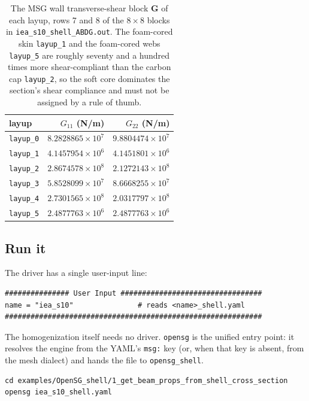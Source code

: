 \begin{table}[htbp]
\centering
\small
\begin{tabular}{lrr}
\toprule
layup & $G_{11}$ (N/m) & $G_{22}$ (N/m) \\
\midrule
\texttt{layup\_0} & $8.2828865\times10^{7}$ & $9.8804474\times10^{7}$ \\
\texttt{layup\_1} & $4.1457954\times10^{6}$ & $4.1451801\times10^{6}$ \\
\texttt{layup\_2} & $2.8674578\times10^{8}$ & $2.1272143\times10^{8}$ \\
\texttt{layup\_3} & $5.8528099\times10^{7}$ & $8.6668255\times10^{7}$ \\
\texttt{layup\_4} & $2.7301565\times10^{8}$ & $2.0317797\times10^{8}$ \\
\texttt{layup\_5} & $2.4877763\times10^{6}$ & $2.4877763\times10^{6}$ \\
\bottomrule
\end{tabular}
\caption{The MSG wall transverse-shear block $\mathbf{G}$ of each layup, rows 7
and 8 of the $8\times8$ blocks in \texttt{iea\_s10\_shell\_ABDG.out}. The
foam-cored skin \texttt{layup\_1} and the foam-cored webs \texttt{layup\_5} are
roughly seventy and a hundred times more shear-compliant than the carbon cap
\texttt{layup\_2}, so the soft core dominates the section's shear compliance and
must not be assigned by a rule of thumb.}
\label{tab:shell-gblocks}
\end{table}

\subsection{Run it}

The driver has a single user-input line:

\begin{lstlisting}[style=opensg,caption={The user-input block of beam\_homo\_shell.py.}]
############### User Input #################################
name = "iea_s10"               # reads <name>_shell.yaml
############################################################
\end{lstlisting}

The homogenization itself needs no driver. \texttt{opensg} is the unified entry
point: it resolves the engine from the YAML's \texttt{msg:} key (or, when that
key is absent, from the mesh dialect) and hands the file to
\texttt{opensg\_shell}.

\begin{lstlisting}[style=shellst]
cd examples/OpenSG_shell/1_get_beam_props_from_shell_cross_section
opensg iea_s10_shell.yaml
\end{lstlisting}

